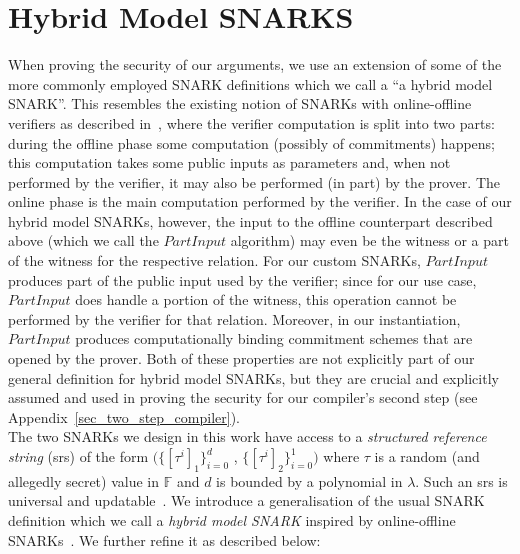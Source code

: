 \section{Hybrid Model SNARKS}
\label{sec:snarks_defs}
\noindent When proving the security of our arguments, we use an extension of some of the more commonly employed SNARK definitions which we call a ``a hybrid model SNARK''. This resembles the existing notion of SNARKs with online-offline verifiers as described in~\cite{HP_paper}, where the 
verifier computation is split into two parts: during the offline phase some computation (possibly of commitments) happens; this computation takes some public inputs as parameters and, when not performed by the verifier, it may also be performed (in part) by the prover. The online phase is the main computation performed by the verifier. In the case of our hybrid model SNARKs, however, the input to the offline counterpart described above (which we call the $\mathit{PartInput}$ algorithm) may even be the witness or 
a part of the witness for the respective relation. For our custom SNARKs, $\mathit{PartInput}$ produces part of the public input used by the verifier; 
since for our use case, $\mathit{PartInput}$ does handle a portion of the witness, this operation cannot be performed by the verifier for that relation. 
Moreover, in our instantiation, $\mathit{PartInput}$ produces computationally binding commitment schemes that are opened by the prover. Both of these properties 
are not explicitly part of our general definition for hybrid model SNARKs, but they are crucial and explicitly assumed and used 
in proving the security for our compiler's second step (see Appendix~\ref{sec_two_step_compiler}).\\

\noindent The two SNARKs we design in this work have access to a \emph{structured reference string} (srs) of the form 
$(\{[\tau^i]_1\}_{i=0}^{d}$ , $\{[\tau^i]_2\}_{i=0}^{1})$ where $\tau$ is a random (and allegedly secret) value in $\mathbb{F}$ and $d$ 
is bounded by a polynomial in $\lambda$. Such an srs is universal and updatable~\cite{updatable_universal_srs_2018}. 
We introduce a generalisation of the usual SNARK definition which we call a \emph{hybrid model SNARK} inspired by online-offline SNARKs~\cite{HP_paper}. We further refine it as described below:     

